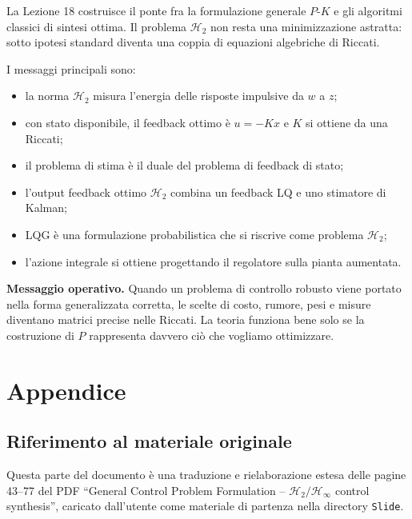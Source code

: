 \documentclass[11pt,a4paper]{article}
\begin{document}
La Lezione 18 costruisce il ponte fra la formulazione generale $P$-$K$ e gli algoritmi classici di sintesi ottima. Il problema $\mathcal{H}_2$ non resta una minimizzazione astratta: sotto ipotesi standard diventa una coppia di equazioni algebriche di Riccati.

I messaggi principali sono:
\begin{itemize}
    \item la norma $\mathcal{H}_2$ misura l'energia delle risposte impulsive da $w$ a $z$;
    \item con stato disponibile, il feedback ottimo \`e $u=-Kx$ e $K$ si ottiene da una Riccati;
    \item il problema di stima \`e il duale del problema di feedback di stato;
    \item l'output feedback ottimo $\mathcal{H}_2$ combina un feedback LQ e uno stimatore di Kalman;
    \item LQG \`e una formulazione probabilistica che si riscrive come problema $\mathcal{H}_2$;
    \item l'azione integrale si ottiene progettando il regolatore sulla pianta aumentata.
\end{itemize}

\begin{keybox}
\textbf{Messaggio operativo.} Quando un problema di controllo robusto viene portato nella forma generalizzata corretta, le scelte di costo, rumore, pesi e misure diventano matrici precise nelle Riccati. La teoria funziona bene solo se la costruzione di $P$ rappresenta davvero ci\`o che vogliamo ottimizzare.
\end{keybox}

\clearpage
{}
\section*{Appendice}

\subsection*{Riferimento al materiale originale}
{}

Questa parte del documento \`e una traduzione e rielaborazione estesa delle pagine 43--77 del PDF ``General Control Problem Formulation -- $\mathcal{H}_2/\mathcal{H}_\infty$ control synthesis'', caricato dall'utente come materiale di partenza nella directory \texttt{Slide}.
\end{document}
